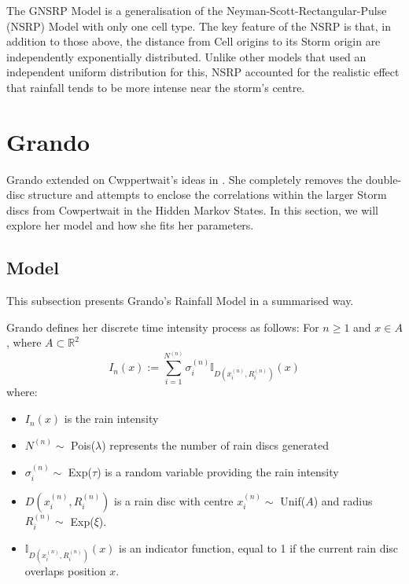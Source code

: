 The GNSRP Model is a generalisation of the Neyman-Scott-Rectangular-Pulse (NSRP) Model with only one cell type. The key feature of the NSRP is that, in addition to those above, the distance from Cell origins to its Storm origin are independently exponentially distributed. Unlike other models that used an independent uniform distribution for this, NSRP accounted for the realistic effect that rainfall tends to be more intense near the storm's centre.

\section{Grando}
\label{Replicating_Existing_Rainfall_Model:Grando}
Grando extended on Cwppertwait's ideas in \cite{Grando2019}. She completely removes the double-disc structure and attempts to enclose the correlations within the larger Storm discs from Cowpertwait in the Hidden Markov States. In this section, we will explore her model and how she fits her parameters.

    \subsection{Model}
    \label{Replicating_Existing_Rainfall_Model:Grando:Model}
    This subsection presents Grando's Rainfall Model in a summarised way.

    Grando defines her discrete time intensity process as follows:
    For $n \geq 1$ and $x \in A$, where $A \subset \mathbb{R}^2$
    \begin{equation}
        I_n(x) := \sum_{i=1}^{N^{(n)}} \sigma_i^{(n)} \mathbb{I}_{D(x_i^{(n)},R_i^{(n)})} (x)
    \end{equation}
    where:
    \begin{itemize}
        \item $I_n(x)$ is the rain intensity
        \item $N^{(n)} \sim$ Pois($\lambda$) represents the number of rain discs generated
        \item $\sigma_i^{(n)} \sim$ Exp($\tau$) is a random variable providing the rain intensity
        \item  $D(x_i^{(n)},R_i^{(n)})$ is a rain disc with centre $x_i^{(n)} \sim$ Unif($A$) and radius $R_i^{(n)} \sim$ Exp($\xi$).
        \item $\mathbb{I}_{D(x_i^{(n)},R_i^{(n)})} (x)$ is an indicator function, equal to 1 if the current rain disc overlaps position $x$.
    \end{itemize}

